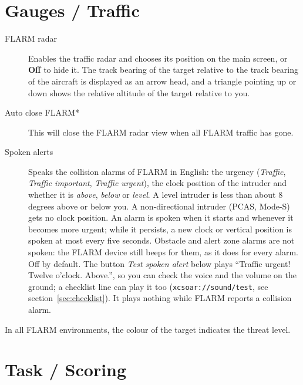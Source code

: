 \section{Gauges / Traffic} \label{sec:flarmandother-gauge}

\begin{description}
\item[FLARM radar]  \label{conf:flarmdisplay}\label{conf:flarmradar-place} Enables the traffic radar and
  chooses its position on the main screen, or {\bf Off} to hide it.
  The track bearing of the target relative to the track bearing of the 
  aircraft is displayed as an arrow head, and a triangle pointing up or down shows 
  the relative altitude of the target relative to you.
\\
\item[Auto close FLARM*]  This will close the FLARM radar view when all FLARM 
  traffic has gone.
\item[Spoken alerts] \label{conf:flarmspokenalerts} Speaks the collision
  alarms of FLARM in English: the urgency ({\em Traffic}, {\em Traffic
  important}, {\em Traffic urgent}), the clock position of the
  intruder and whether it is {\em above}, {\em below} or {\em level}.
  A level intruder is less than about 8 degrees above or below you.
  A non-directional intruder (PCAS, Mode-S) gets no clock position.
  An alarm is spoken when it starts and whenever it becomes more
  urgent; while it persists, a new clock or vertical position is
  spoken at most every five seconds.  Obstacle and alert zone alarms
  are not spoken: the FLARM device still beeps for them, as it does
  for every alarm.  Off by default.  The button {\em Test spoken
  alert} below plays ``Traffic urgent! Twelve o'clock. Above.'', so
  you can check the voice and the volume on the ground; a checklist
  line can play it too (\verb|xcsoar://sound/test|, see
  section~\ref{sec:checklist}).  It plays nothing while FLARM reports
  a collision alarm.
\end{description}
In all FLARM environments, the colour of the target indicates the threat level.


\section{Task / Scoring}


